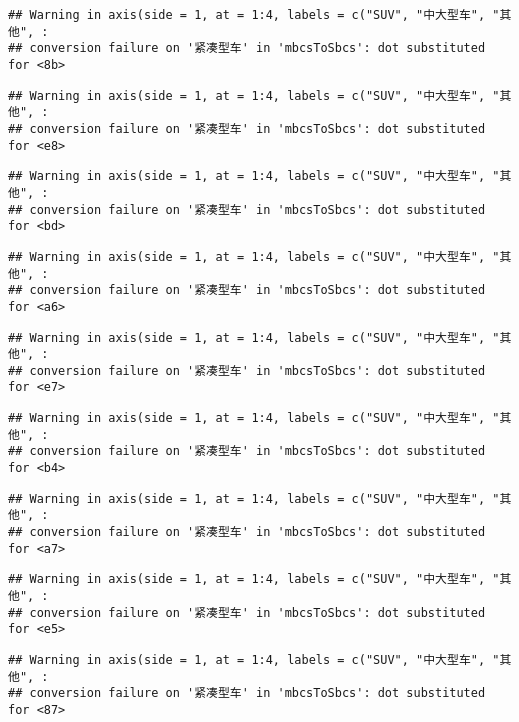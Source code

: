 \documentclass[]{article}
\begin{document}
\begin{verbatim}
## Warning in axis(side = 1, at = 1:4, labels = c("SUV", "中大型车", "其他", :
## conversion failure on '紧凑型车' in 'mbcsToSbcs': dot substituted for <8b>
\end{verbatim}

\begin{verbatim}
## Warning in axis(side = 1, at = 1:4, labels = c("SUV", "中大型车", "其他", :
## conversion failure on '紧凑型车' in 'mbcsToSbcs': dot substituted for <e8>
\end{verbatim}

\begin{verbatim}
## Warning in axis(side = 1, at = 1:4, labels = c("SUV", "中大型车", "其他", :
## conversion failure on '紧凑型车' in 'mbcsToSbcs': dot substituted for <bd>
\end{verbatim}

\begin{verbatim}
## Warning in axis(side = 1, at = 1:4, labels = c("SUV", "中大型车", "其他", :
## conversion failure on '紧凑型车' in 'mbcsToSbcs': dot substituted for <a6>
\end{verbatim}

\begin{verbatim}
## Warning in axis(side = 1, at = 1:4, labels = c("SUV", "中大型车", "其他", :
## conversion failure on '紧凑型车' in 'mbcsToSbcs': dot substituted for <e7>
\end{verbatim}

\begin{verbatim}
## Warning in axis(side = 1, at = 1:4, labels = c("SUV", "中大型车", "其他", :
## conversion failure on '紧凑型车' in 'mbcsToSbcs': dot substituted for <b4>
\end{verbatim}

\begin{verbatim}
## Warning in axis(side = 1, at = 1:4, labels = c("SUV", "中大型车", "其他", :
## conversion failure on '紧凑型车' in 'mbcsToSbcs': dot substituted for <a7>
\end{verbatim}

\begin{verbatim}
## Warning in axis(side = 1, at = 1:4, labels = c("SUV", "中大型车", "其他", :
## conversion failure on '紧凑型车' in 'mbcsToSbcs': dot substituted for <e5>
\end{verbatim}

\begin{verbatim}
## Warning in axis(side = 1, at = 1:4, labels = c("SUV", "中大型车", "其他", :
## conversion failure on '紧凑型车' in 'mbcsToSbcs': dot substituted for <87>
\end{verbatim}
\end{document}
